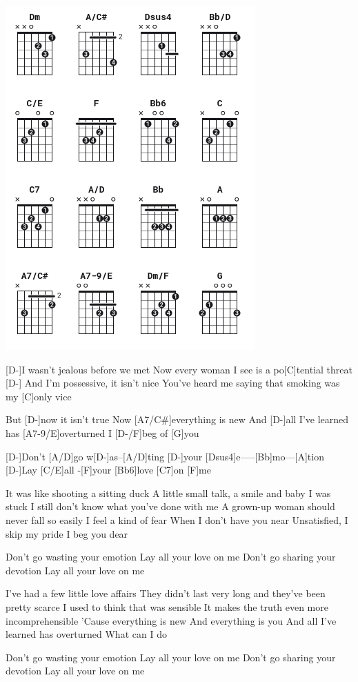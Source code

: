 

\includegraphics[scale=0.5]{songs/accords_lay_all_your_love_on_me.png}

\begin{guitar}

[D-]I wasn't jealous before we met
Now every woman I see is a po[C]tential threat
[D-] And I'm possessive, it isn't nice
You've heard me saying that smoking was my [C]only vice


But [D-]now it isn't true
Now [A7/C#]everything is new
And [D-]all I've learned has [A7-9/E]overturned
I [D-/F]beg of [G]you

[D-]Don't  [A/D]go w[D-]as--[A/D]ting [D-]your [Dsus4]e-----[Bb]mo---[A]tion
[D-]Lay [C/E]all -[F]your [Bb6]love [C7]on [F]me

It was like shooting a sitting duck
A little small talk, a smile and baby I was stuck
I still don't know what you've done with me
A grown-up woman should never fall so easily
I feel a kind of fear
When I don't have you near
Unsatisfied, I skip my pride
I beg you dear

Don't go wasting your emotion
Lay all your love on me
Don't go sharing your devotion
Lay all your love on me

I've had a few little love affairs
They didn't last very long and they've been pretty scarce
I used to think that was sensible
It makes the truth even more incomprehensible
'Cause everything is new
And everything is you
And all I've learned has overturned
What can I do

Don't go wasting your emotion
Lay all your love on me
Don't go sharing your devotion
Lay all your love on me 

\end{guitar}